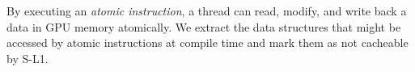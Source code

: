 By executing an {\it atomic instruction}, a thread can read, modify, and write back a data in GPU
memory atomically.
We extract the data structures that might be accessed by atomic instructions at compile time and mark them as not cacheable by S-L1.




